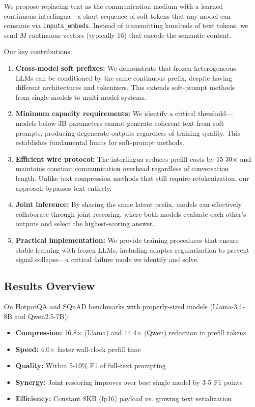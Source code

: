 \documentclass{article}
\begin{document}
We propose replacing text as the communication medium with a learned continuous interlingua—a short sequence of soft tokens that any model can consume via \texttt{inputs\_embeds}. Instead of transmitting hundreds of text tokens, we send $M$ continuous vectors (typically 16) that encode the semantic content.

Our key contributions:

\begin{enumerate}
\item \textbf{Cross-model soft prefixes:} We demonstrate that frozen heterogeneous LLMs can be conditioned by the same continuous prefix, despite having different architectures and tokenizers. This extends soft-prompt methods~\cite{lester2021prompt,li2021prefix} from single models to multi-model systems.

\item \textbf{Minimum capacity requirements:} We identify a critical threshold—models below 3B parameters cannot generate coherent text from soft prompts, producing degenerate outputs regardless of training quality. This establishes fundamental limits for soft-prompt methods.

\item \textbf{Efficient wire protocol:} The interlingua reduces prefill costs by 15-30$\times$ and maintains constant communication overhead regardless of conversation length. Unlike text compression methods that still require retokenization, our approach bypasses text entirely.

\item \textbf{Joint inference:} By sharing the same latent prefix, models can effectively collaborate through joint rescoring, where both models evaluate each other's outputs and select the highest-scoring answer.

\item \textbf{Practical implementation:} We provide training procedures that ensure stable learning with frozen LLMs, including adapter regularization to prevent signal collapse—a critical failure mode we identify and solve.
\end{enumerate}

\subsection{Results Overview}

On HotpotQA and SQuAD benchmarks with properly-sized models (Llama-3.1-8B and Qwen2.5-7B):
\begin{itemize}
\item \textbf{Compression:} 16.8$\times$ (Llama) and 14.4$\times$ (Qwen) reduction in prefill tokens
\item \textbf{Speed:} 4.0$\times$ faster wall-clock prefill time
\item \textbf{Quality:} Within 5-10\% F1 of full-text prompting
\item \textbf{Synergy:} Joint rescoring improves over best single model by 3-5 F1 points
\item \textbf{Efficiency:} Constant 8KB (fp16) payload vs. growing text serialization
\end{itemize}
\end{document}
